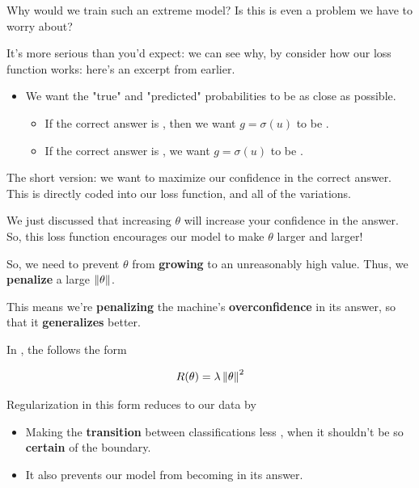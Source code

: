         \subsecdiv

        Why would we train such an extreme model? Is this is even a problem we have to worry about?

        It's more serious than you'd expect: we can see why, by consider how our loss function works: here's an excerpt from earlier.

        \begin{itemize}
            \item We want the "true" and "predicted" probabilities to be as close as possible.
                \begin{itemize}
                    \item If the correct answer is , then we want $g=\sigma(u)$ to be .
                    \item If the correct answer is , we want $g=\sigma(u)$ to be .
                \end{itemize}
        \end{itemize}

        The short version: we want to maximize our confidence in the correct answer. This is directly coded into our loss function, and all of the variations.

        We just discussed that increasing $\theta$ will increase your confidence in the answer. So, this loss function encourages our model to make $\theta$ larger and larger!
        
        So, we need to prevent $\theta$ from \textbf{growing} to an unreasonably high value. Thus, we \textbf{penalize} a large $\left\lVert\theta\right\rVert$.
        
        This means we're \textbf{penalizing} the machine's \textbf{overconfidence} in its answer, so that it \textbf{generalizes} better.\\
        
        \begin{concept}
            In , the  follows the form
            
            \begin{equation*}
                R(\theta)=\lambda \left\lVert\theta\right\rVert^2
            \end{equation*}
            
            Regularization in this form reduces  to our data by
            \begin{itemize}
                \item Making the \textbf{transition} between classifications less , when it shouldn't be so \textbf{certain} of the boundary.
                \item It also prevents our model from becoming  in its answer.
            \end{itemize} 
        \end{concept}

